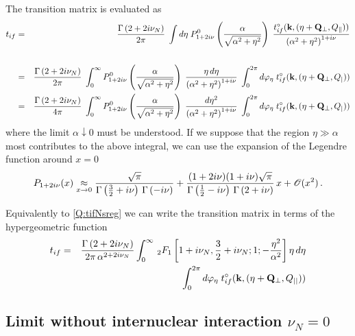 The transition matrix is evaluated as
\begin{eqnarray}\label{Q:tifNsreg}
t_{if} &=&   \frac{\Gamma \left( 2 + 2 i \nu_{N} \right)}{2 \pi} \;
\int d \mathbf{\eta} \; P^{0}_{1 + 2 i \nu} \left(
\frac{\alpha}{\sqrt{\alpha^{2}+ \eta^{2}}}\right) \;
\frac{t^{\circ}_{if}(\mathbf{k},(\mathbf{\eta}+\mathbf{Q}_{\perp},Q_{\parallel}))} {
\left( {\alpha^{2} + \eta^{2}} \right)^{1+i \nu}} \nonumber \\ \\
&=&  \frac{\Gamma \left( 2 + 2 i \nu_{N} \right)}{2 \pi} \;
\int_{0}^{\infty} P^{0}_{1 + 2 i \nu} \left(
\frac{\alpha}{\sqrt{\alpha^{2}+ \eta^{2}}} \right) \; \frac{\eta \,
d \eta}{\left( {\alpha^{2} + \eta^{2}} \right)^{1+i \nu}}
\;\int_{0}^{2 \pi} d \varphi_{\eta} \;
t^{\circ}_{if}(\mathbf{k},(\mathbf{\eta}+\mathbf{Q}_{\perp},Q_{\mid }))\nonumber
\\
&=&  \frac{\Gamma \left( 2 + 2 i \nu_{N} \right)}{4 \pi} \;
\int_{0}^{\infty} P^{0}_{1 + 2 i \nu} \left(
\frac{\alpha}{\sqrt{\alpha^{2}+ \eta^{2}}} \right) \; \frac{d
\eta^{2}}{ \left( {\alpha^{2} + \eta^{2}} \right)^{1+i \nu}}
\;\int_{0}^{2 \pi} d \varphi_{\eta} \;
t^{\circ}_{if}(\mathbf{k},(\mathbf{\eta}+\mathbf{Q}_{\perp},Q_{\mid }))\nonumber
\end{eqnarray}
%
where the limit $\alpha \downarrow 0$ must be understood. If we suppose
that the region $\eta \gg \alpha $ most contributes to the above
integral, we can use the expansion of the Legendre function around
$x=0$
%
\[
P_{1 + 2 i \nu} (x) \mathrel{\mathop{\kern0pt\approx}\limits_{x \to 0}}
\frac{\sqrt{\pi}}{\Gamma\left(\frac{3}{2} + i \nu \right) \,
\Gamma\left(-i \nu\right)} + \frac{(1 + 2 i \nu) (1 + i \nu)
\sqrt{\pi}}{\Gamma\left(\frac{1}{2} - i \nu \right) \,
\Gamma\left(2+ i \nu \right)}\, x + \mathcal{O}(x^{2}) \, .
\]


Equivalently to \ref{Q:tifNsreg} we can write the transition matrix in
terms of the hypergeometric function
%
\begin{eqnarray}\label{Q:t_if-Nint-hyperg}
t_{if} & =&\frac{\Gamma \left( 2 + 2 i \nu_{N} \right)}{2 \pi \,
\alpha^{2 + 2 i \nu_{N}}} \int_{0}^{\infty} \,{_{2}F_{1}}\left[ 1 +
i \nu_{N}, \frac{3}{2} + i \nu_{N} ; 1; -
\frac{\eta^{2}}{\alpha^{2}} \right] \eta \, d \eta \nonumber
\\
&&\int_{0}^{2 \pi} d \varphi_{\eta} \;
t^{\circ}_{if}(\mathbf{k},(\mathbf{\eta}+\mathbf{Q}_{\perp},Q_{\mid  \mid }))
\end{eqnarray}

\subsection*{Limit without internuclear interaction $\nu_{N}=0$}

